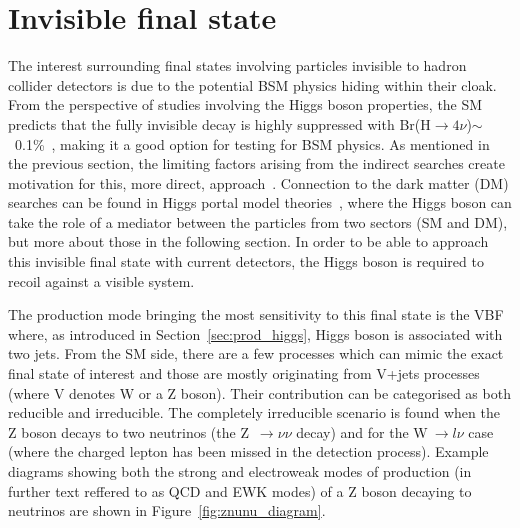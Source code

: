 \section{Invisible final state}
\hspace{10pt} The interest surrounding final states involving particles invisible to hadron collider detectors is due to the potential BSM physics hiding within their cloak. From the perspective of studies involving the Higgs boson properties, the SM predicts that the fully invisible decay is highly suppressed with Br(H$\rightarrow4\nu$)$\sim$~0.1\%~\cite{report_lhcxswg_3}, making it a good option for testing for BSM physics. As mentioned in the previous section, the limiting factors arising from the indirect searches create motivation for this, more direct, approach~\cite{paper:hinv_run1,paper:HIG_17_023,Patrick,Riccardo}. Connection to the dark matter (DM) searches can be found in Higgs portal model theories~\cite{paper:hig_portal_models1,paper:hig_portal_models2,paper:hig_portal_models3,paper:hig_portal_models4}, where the Higgs boson can take the role of a mediator between the particles from two sectors (SM and DM), but more about those in the following section. In order to be able to approach this invisible final state with current detectors, the Higgs boson is required to recoil against a visible system.

\hspace{10pt} The production mode bringing the most sensitivity to this final state is the VBF where, as introduced in Section~\ref{sec:prod_higgs}, Higgs boson is associated with two jets. From the SM side, there are a few processes which can mimic the exact final state of interest and those are mostly originating from V+jets processes (where V denotes W or a Z boson). Their contribution can be categorised as both reducible and irreducible. The completely irreducible scenario is found when the Z boson decays to two neutrinos (the Z~$\rightarrow\nu\nu$ decay) and for the W$~\rightarrow l\nu$ case (where the charged lepton has been missed in the detection process). Example diagrams showing both the strong and electroweak modes of production (in further text reffered to as QCD and EWK modes) of a Z boson decaying to neutrinos are shown in Figure~\ref{fig:znunu_diagram}. 

